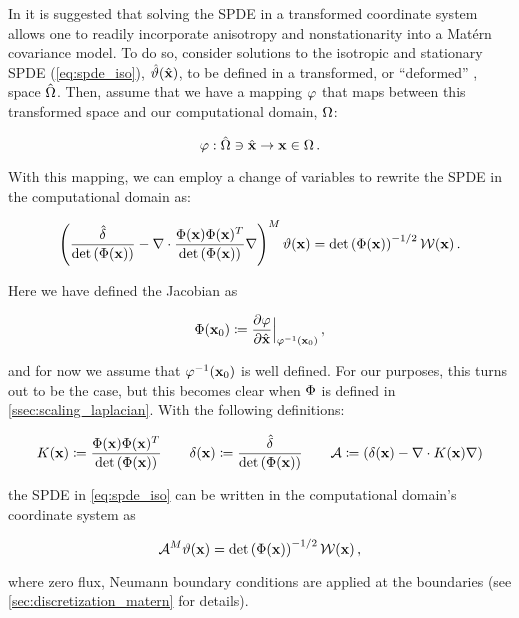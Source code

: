 In \citet{RSSB:RSSB777} it is suggested that solving the SPDE in a transformed
coordinate system allows one to readily incorporate anisotropy and
nonstationarity into a Mat\'ern covariance model.
To do so, consider solutions to the isotropic and stationary SPDE
(\cref{eq:spde_iso}), $\hat{\vartheta}(\hat{\mathbf{x}})$, to be defined in a transformed, or
``deformed'' \citep{sampson_nonparametric_1992}, space $\hat{\Omega}$.
Then, assume that we have a mapping $\varphi$ that maps between this transformed space
and our computational domain, $\Omega$:
\begin{linenomath*}\begin{equation*}
    \varphi : \hat{\Omega}\ni\hat{\mathbf{x}} \rightarrow \mathbf{x}\in\Omega \, .
\end{equation*}\end{linenomath*}
With this mapping, we can employ a change of variables
\citep{smith_change_1934} to rewrite the SPDE in the computational domain as:
\begin{linenomath*}\begin{equation*}
    \left(\dfrac{\hat{\delta}}{\text{det}\left(\Phi(\mathbf{x})\right)} -
    \nabla\cdot
    \dfrac{\Phi(\mathbf{x})\Phi(\mathbf{x})^T}{\text{det}\left(\Phi(\mathbf{x})\right)}
    \nabla\right)^M\vartheta(\mathbf{x}) =
    \text{det}\left(\Phi(\mathbf{x})\right)^{-1/2}\mathcal{W}(\mathbf{x}) \, .
\end{equation*}\end{linenomath*}
Here we have defined the Jacobian as
\begin{linenomath*}\begin{equation*}
    \Phi(\mathbf{x}_0) \coloneqq
    \dfrac{\partial \varphi}{\partial \hat{\mathbf{x}}}\Big|_{\varphi^{-1}(\mathbf{x}_{0})} \, ,
\end{equation*}\end{linenomath*}
and for now we assume that $\varphi^{-1}(\mathbf{x}_0)$ is well defined.
For our purposes, this turns out to be the case, but this becomes clear when
$\Phi$ is defined in \cref{ssec:scaling_laplacian}.
With the following definitions:
\begin{linenomath*}\begin{equation}
        K(\mathbf{x}) \coloneqq
        \dfrac{\Phi(\mathbf{x})\Phi(\mathbf{x})^T}{\text{det}\left(\Phi(\mathbf{x})\right)}
        \qquad
        \delta(\mathbf{x}) \coloneqq \dfrac{\hat{\delta}}{\text{det}\left(\Phi(\mathbf{x})\right)}
        \qquad
        \mathcal{A} \coloneqq \left(\delta(\mathbf{x}) - \nabla\cdot K(\mathbf{x})\nabla\right)
    \label{eq:matern_definitions}
\end{equation}\end{linenomath*}
the SPDE in \cref{eq:spde_iso} can be written in the computational domain's coordinate system as
\begin{linenomath*}\begin{equation}
    \mathcal{A}^M \vartheta(\mathbf{x}) =
    \text{det}\left(\Phi(\mathbf{x})\right)^{-1/2}\mathcal{W}(\mathbf{x}) \, ,
    \label{eq:spde_general}
\end{equation}\end{linenomath*}
where zero flux, Neumann boundary conditions are applied at the boundaries
(see \cref{sec:discretization_matern} for details).

